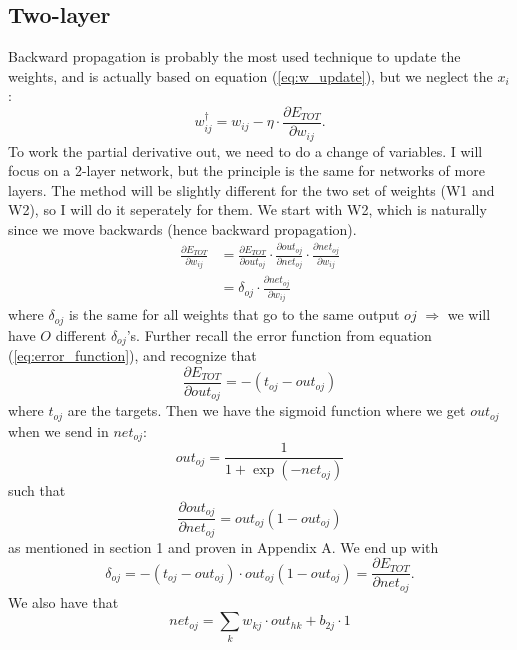 \subsection{Two-layer}
Backward propagation is probably the most used technique to update the weights, and is actually based on equation (\ref{eq:w_update}), but we neglect the $x_i$:
\begin{equation}
w_{ij}^{\dagger}=w_{ij} - \eta\cdot \frac{\partial E_{TOT}}{\partial w_{ij}}.
\end{equation}
To work the partial derivative out, we need to do a change of variables. I will focus on a 2-layer network, but the principle is the same for networks of more layers. The method will be slightly different for the two set of weights (W1 and W2), so I will do it seperately for them. We start with W2, which is naturally since we move backwards (hence backward propagation). 
\begin{align}
\frac{\partial E_{TOT}}{\partial w_{ij}}&=\frac{\partial E_{TOT}}{\partial out_{oj}}\cdot\frac{\partial out_{oj}}{\partial net_{oj}}\cdot\frac{\partial net_{oj}}{\partial w_{ij}}\\
&=\delta_{oj}\cdot\frac{\partial net_{oj}}{\partial w_{ij}}
\end{align}
where $\delta_{oj}$ is the same for all weights that go to the same output $oj$ $\Rightarrow$ we will have $O$ different $\delta_{oj}$'s. Further recall the error function from equation (\ref{eq:error_function}), and recognize that
\begin{equation}
\frac{\partial E_{TOT}}{\partial out_{oj}}=-(t_{oj}-out_{oj})
\end{equation}
where $t_{oj}$ are the targets. Then we have the sigmoid function where we get $out_{oj}$ when we send in $net_{oj}$:
\begin{equation}
out_{oj}=\frac{1}{1+\exp(-net_{oj})}
\end{equation}
such that
\begin{equation}
\frac{\partial out_{oj}}{\partial net_{oj}}=out_{oj}(1-out_{oj})
\end{equation}
as mentioned in section 1 and proven in Appendix A. We end up with
\begin{equation}
\delta_{oj}=-(t_{oj}-out_{oj})\cdot out_{oj}(1-out_{oj})=\frac{\partial E_{TOT}}{\partial net_{oj}}.
\end{equation}
We also have that
\begin{equation}
net_{oj}=\sum_k w_{kj}\cdot out_{hk} + b_{2j}\cdot 1
\end{equation}
